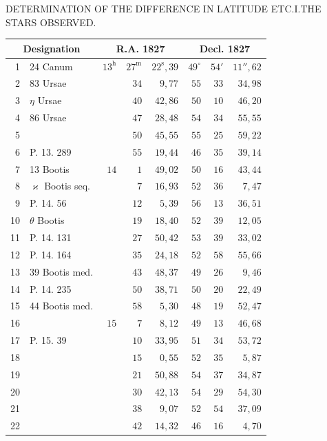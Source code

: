 \clearpage
\noindent\parbox[t]{\dimexpr\textwidth-10mm\relax}{\centering\scriptsize DETERMINATION OF THE DIFFERENCE IN LATITUDE ETC.\quad I.\quad THE STARS OBSERVED.}\par
\begin{center}
\begin{minipage}[t]{.49\textwidth}\centering
{\scriptsize\setlength{\tabcolsep}{1.2pt}\renewcommand{\arraystretch}{1.2}\begin{tabular}{r|l|rrr|rrr|}
\multicolumn{2}{c|}{Designation}&\multicolumn{3}{c|}{R.A. 1827}&\multicolumn{3}{c|}{Decl. 1827}\\\hline
1&24 Canum&$13^{\mathrm h}$&$27^{\mathrm m}$&$22^{\mathrm s}{,}39$&$49^\circ$&$54'$&$11''{,}62$\\
2&83 Ursae&&$34$&$9{,}77$&$55$&$33$&$34{,}98$\\
3&$\eta$ Ursae&&$40$&$42{,}86$&$50$&$10$&$46{,}20$\\
4&86 Ursae&&$47$&$28{,}48$&$54$&$34$&$55{,}55$\\
5&&&$50$&$45{,}55$&$55$&$25$&$59{,}22$\\
6&P. 13. 289&&$55$&$19{,}44$&$46$&$35$&$39{,}14$\\
7&13 Bootis&$14$&$1$&$49{,}02$&$50$&$16$&$43{,}44$\\
8&$\varkappa$ Bootis seq.&&$7$&$16{,}93$&$52$&$36$&$7{,}47$\\
9&P. 14. 56&&$12$&$5{,}39$&$56$&$13$&$36{,}51$\\
10&$\theta$ Bootis&&$19$&$18{,}40$&$52$&$39$&$12{,}05$\\
11&P. 14. 131&&$27$&$50{,}42$&$53$&$39$&$33{,}02$\\
12&P. 14. 164&&$35$&$24{,}18$&$52$&$58$&$55{,}66$\\
13&39 Bootis med.&&$43$&$48{,}37$&$49$&$26$&$9{,}46$\\
14&P. 14. 235&&$50$&$38{,}71$&$50$&$20$&$22{,}49$\\
15&44 Bootis med.&&$58$&$5{,}30$&$48$&$19$&$52{,}47$\\
16&&$15$&$7$&$8{,}12$&$49$&$13$&$46{,}68$\\
17&P. 15. 39&&$10$&$33{,}95$&$51$&$34$&$53{,}72$\\
18&&&$15$&$0{,}55$&$52$&$35$&$5{,}87$\\
19&&&$21$&$50{,}88$&$54$&$37$&$34{,}87$\\
20&&&$30$&$42{,}13$&$54$&$29$&$54{,}30$\\
21&&&$38$&$9{,}07$&$52$&$54$&$37{,}09$\\
22&&&$42$&$14{,}32$&$46$&$16$&$4{,}70$\\

\end{tabular}}
\end{minipage}
\end{center}
